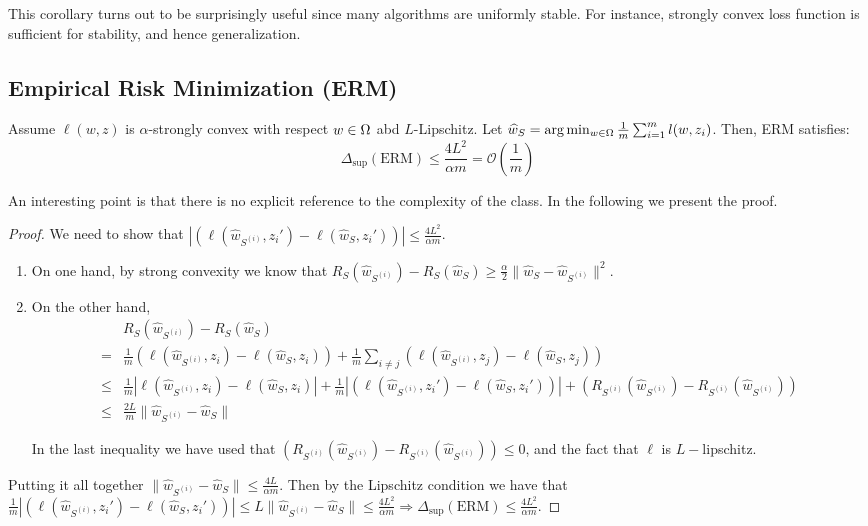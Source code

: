 This corollary turns out to be surprisingly useful since many algorithms are uniformly stable. For instance, strongly convex loss function is sufficient for stability, and hence generalization.

\subsection{Empirical Risk Minimization (ERM)}



\begin{theorem}Assume $\ell(w, z)$ is $\alpha$-strongly convex with respect $w \in \Omega$ abd $L$-Lipschitz. Let $\widehat w_S = \arg \min_{w\in \Omega} \frac{1}{m} \sum_{i=1}^m l(w, z_i)$. Then, ERM satisfies:
\begin{equation*}
\Delta_{\sup} (\text{ERM}) \leq \frac{4L^2}{\alpha m} = \mathcal{O}(\frac{1}{m}) 
\end{equation*}
\end{theorem}

An interesting point is that there is no explicit reference to the complexity of the class. In the following we present the proof.

\begin{proof}
We need to show that $| ( \ell(\hat w_{S^{(i)}}, z_i') - \ell(\hat w_{S}, z_i')) |  \leq \frac{4 L^2}{\alpha m}$.
\begin{enumerate}
\item On one hand, by strong convexity we know that
$R_S(\hat w_{S^{(i)}}) - R_S(\hat w_{S}) \geq \frac{\alpha}{2} \| \hat w_{S} - \hat w_{S^{(i)}} \|^2 $.

\item On the other hand, 
\begin{align*}
& R_S(\hat w_{S^{(i)}}) - R_S(\hat w_{S})\\
= & \frac{1}{m} ( \ell(\hat w_{S^{(i)}}, z_i) - \ell(\hat w_{S}, z_i)) + \frac{1}{m} \sum_{i \neq j} ( \ell(\hat w_{S^{(i)}}, z_j) - \ell(\hat w_{S}, z_j))\\
\leq &\frac{1}{m} | \ell(\hat w_{S^{(i)}}, z_i) - \ell(\hat w_{S}, z_i)| + \frac{1}{m} | ( \ell(\hat w_{S^{(i)}}, z_i') - \ell(\hat w_{S}, z_i')) | + (R_{S^{(i)}}(\hat w_{S^{(i)}}) - R_{S^{(i)}}(\hat w_{S^{(i)}}))\\ 
\leq & \frac{2 L}{m} \| \hat w_{S^{(i)}} - \hat w_{S}\| 
\end{align*}

In the last inequality we have used that $ (R_{S^{(i)}}(\hat w_{S^{(i)}}) - R_{S^{(i)}}(\hat w_{S^{(i)}})) \leq 0$, and the fact that $\ell$ is $L-$lipschitz.
\end{enumerate}

Putting it all together $\| \hat w_{S^{(i)}} - \hat w_{S} \| \leq \frac{4 L}{\alpha m}$. Then by the Lipschitz condition we have that $\frac{1}{m} | ( \ell(\hat w_{S^{(i)}}, z_i') - \ell(\hat w_{S}, z_i')) | \leq L \| \hat w_{S^{(i)}} - \hat w_{S} \| \leq \frac{4 L ^ 2}{\alpha m} \Rightarrow \Delta_{\sup} (\text{ERM}) \leq \frac{4 L ^ 2}{\alpha m}$.

\end{proof}


